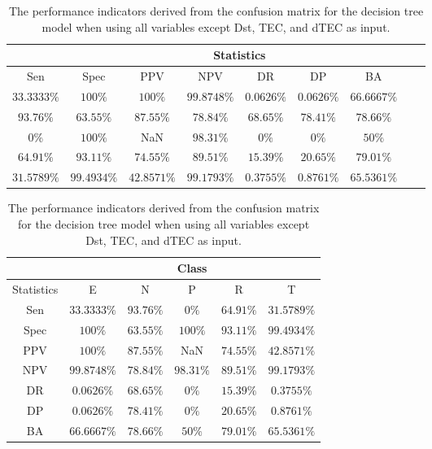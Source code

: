 \begin{table}[!ht]
	\centering
	\begin{tabular}{|c|c|c|c|c|c|c|c|c|}
		\hline
		 & \multicolumn{7}{c|}{Statistics} \\ \hline
		Sen & Spec & PPV & NPV & DR & DP & BA \\ \hline
		$33.3333\%$ & $100\%$ & $100\%$ & $99.8748\%$ & $0.0626\%$ & $0.0626\%$ & $66.6667\%$ \\ \hline
		$93.76\%$ & $63.55\%$ & $87.55\%$ & $78.84\%$ & $68.65\%$ & $78.41\%$ & $78.66\%$ \\ \hline
		$0\%$ & $100\%$ & NaN & $98.31\%$ & $0\%$ & $0\%$ & $50\%$ \\ \hline
		$64.91\%$ & $93.11\%$ & $74.55\%$ & $89.51\%$ & $15.39\%$ & $20.65\%$ & $79.01\%$ \\ \hline
		$31.5789\%$ & $99.4934\%$ & $42.8571\%$ & $99.1793\%$ & $0.3755\%$ & $0.8761\%$ & $65.5361\%$ \\ \hline
	\end{tabular}
	\caption{The performance indicators derived from the confusion matrix for the decision tree model when using all variables except Dst, TEC, and dTEC as input.}
	\label{tab:cs:noTEC:C5.0}
\end{table}

\begin{table}[!ht]
	\centering
	\begin{tabular}{|c|c|c|c|c|c|}
		\hline
		 & \multicolumn{5}{c|}{Class} \\ \hline
		Statistics & E & N & P & R & T \\ \hline
		Sen & $33.3333\%$ & $93.76\%$ & $0\%$ & $64.91\%$ & $31.5789\%$ \\ \hline
		Spec & $100\%$ & $63.55\%$ & $100\%$ & $93.11\%$ & $99.4934\%$ \\ \hline
		PPV & $100\%$ & $87.55\%$ & NaN & $74.55\%$ & $42.8571\%$ \\ \hline
		NPV & $99.8748\%$ & $78.84\%$ & $98.31\%$ & $89.51\%$ & $99.1793\%$ \\ \hline
		DR & $0.0626\%$ & $68.65\%$ & $0\%$ & $15.39\%$ & $0.3755\%$ \\ \hline
		DP & $0.0626\%$ & $78.41\%$ & $0\%$ & $20.65\%$ & $0.8761\%$ \\ \hline
		BA & $66.6667\%$ & $78.66\%$ & $50\%$ & $79.01\%$ & $65.5361\%$ \\ \hline
	\end{tabular}
	\caption{The performance indicators derived from the confusion matrix for the decision tree model when using all variables except Dst, TEC, and dTEC as input.}
	\label{tab:cs:reverse:noTEC:C5.0}
\end{table}
